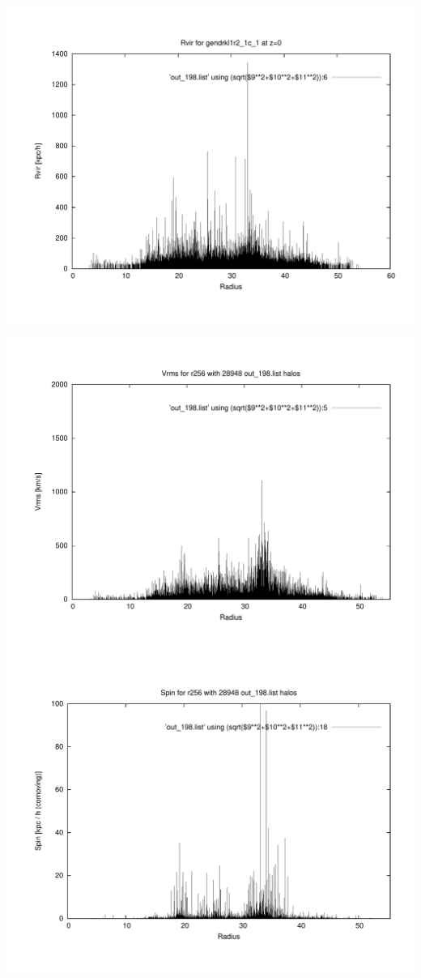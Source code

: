 \includegraphics[scale=0.3]{r256/h100/gendrkl1r2_1c_1/plot_rvir_z0.pdf}

\includegraphics[scale=0.3]{r256/h100/gendrkl1r2_1c_1/plot_Vrms_out_198.pdf}
\includegraphics[scale=0.3]{r256/h100/gendrkl1r2_1c_1/plot_spin_out_198.pdf}


